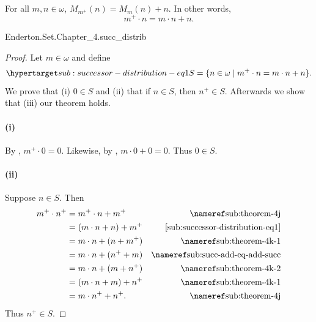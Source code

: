 \documentclass{report}
\begin{document}
\subsection{}%

  \begin{lemma}
    For all $m, n \in \omega$, $M_{m^+}(n) = M_m(n) + n$.
    In other words, $$m^+ \cdot n = m \cdot n + n.$$
  \end{lemma}

    {Enderton.Set.Chapter\_4.succ\_distrib}


  \begin{proof}

    Let $m \in \omega$ and define
      \begin{equation}
        \hyperlabel{sub:successor-distribution-eq1}
        S = \{n \in \omega \mid m^+ \cdot n = m \cdot n + n\}.
      \end{equation}
    We prove that (i) $0 \in S$ and (ii) that if $n \in S$, then $n^+ \in S$.
    Afterwards we show that (iii) our theorem holds.

    \paragraph{(i)}%

      By , $m^+ \cdot 0 = 0$.
      Likewise, by , $m \cdot 0 + 0 = 0$.
      Thus $0 \in S$.

    \paragraph{(ii)}%

      Suppose $n \in S$.
      Then
        \begin{align*}
          m^+ \cdot n^+
            & = m^+ \cdot n + m^+ & \textref{sub:theorem-4j} \\
            & = (m \cdot n + n) + m^+ & \eqref{sub:successor-distribution-eq1} \\
            & = m \cdot n + (n + m^+) & \textref{sub:theorem-4k-1} \\
            & = m \cdot n + (n^+ + m) & \textref{sub:succ-add-eq-add-succ} \\
            & = m \cdot n + (m + n^+) & \textref{sub:theorem-4k-2} \\
            & = (m \cdot n + m) + n^+ & \textref{sub:theorem-4k-1} \\
            & = m \cdot n^+ + n^+. & \textref{sub:theorem-4j}
        \end{align*}
      Thus $n^+ \in S$.


\end{proof}
\end{document}
